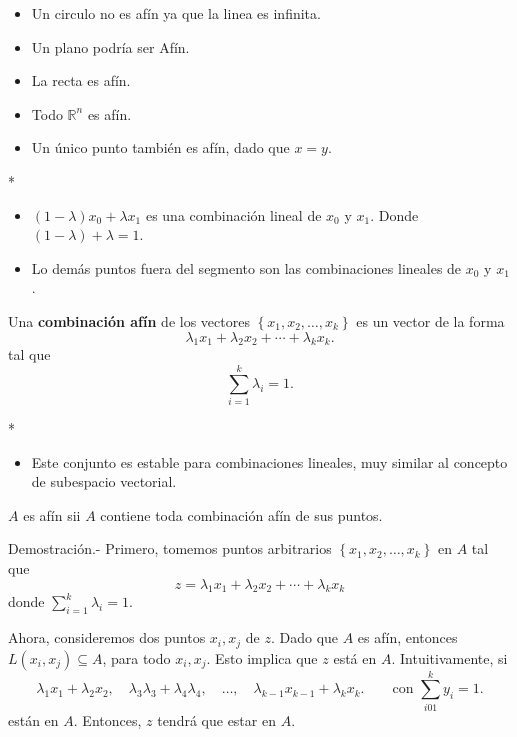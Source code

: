 \begin{paracol}{2}
\begin{itemize}
    \item Un circulo no es afín ya que la linea es infinita.
    \item Un plano podría ser Afín.
    \item La recta es afín.
    \item Todo $\mathbb{R}^n$ es afín.
    \item Un único punto también es afín, dado que $x=y$.
\end{itemize}

\switchcolumn[1]*{\noindent\scriptsize
\begin{itemize}
    \item $(1-\lambda)x_0+\lambda x_1$ es una combinación lineal de $x_0$ y $x_1$. Donde $(1-\lambda)+\lambda=1$.
    \item Lo demás puntos fuera del segmento son las combinaciones lineales de $x_0$ y $x_1$.
\end{itemize}
}

\switchcolumn[0]\noindent
\begin{def.}
    Una \textbf{combinación afín} de los vectores $\left\{x_1,x_2,\ldots,x_k\right\}$ es un vector de la forma 
$$\lambda_1 x_1+\lambda_2x_2+\cdots+\lambda_kx_k.$$
tal que 
$$\sum_{i=1}^k \lambda_i = 1.$$
\end{def.}

\switchcolumn[1]*{\noindent\scriptsize
    \begin{itemize}
	\item Este conjunto es estable para combinaciones lineales, muy similar al concepto de subespacio vectorial.
    \end{itemize}
}
\switchcolumn[0]\noindent
{\color{blue}
    \begin{teo}
    $A$ es afín sii $A$ contiene toda combinación afín de sus puntos.

	Demostración.-\; Primero, tomemos puntos arbitrarios $\left\{x_1,x_2,\ldots,x_k\right\}$ en $A$ tal que 
	$$z=\lambda_1x_1+\lambda_2x_2+\cdots+\lambda_kx_k$$
	donde $\sum\limits_{i=1}^k \lambda_i = 1$. 

	Ahora, consideremos dos puntos $x_i,x_j$ de $z$. Dado que $A$ es afín, entonces $L(x_i,x_j)\subseteq A$, para todo $x_i,x_j$. Esto implica que $z$ está en $A$. Intuitivamente, si 
	$$\lambda_1x_1+\lambda_2 x_2,\quad \lambda_3\lambda_3+\lambda_4\lambda_4,\quad \ldots,\quad  \lambda_{k-1}x_{k-1}+\lambda_kx_k.\qquad \text{con } \sum_{i01}^k y_i=1.$$ 
	están en $A$. Entonces, $z$ tendrá que estar en $A$.


\end{teo}}
\end{paracol}
